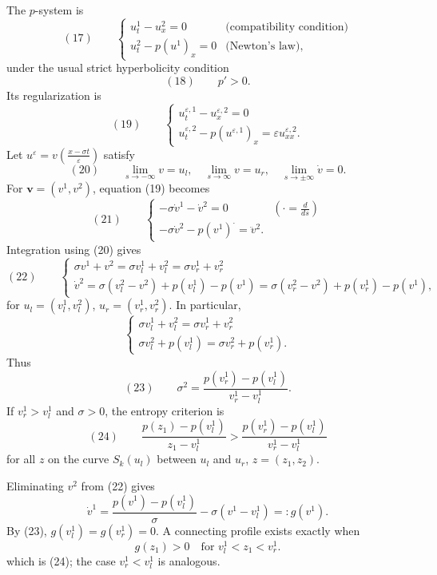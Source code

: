 \begin{example}
\label{ex:traveling-waves-p-system}

The $p$-system is
$$(17) \qquad \begin{cases} u^1_t - u^2_x = 0 & \text{(compatibility condition)} \\ u^2_t - p(u^1)_x = 0 & \text{(Newton's law)}, \end{cases}$$
under the usual strict hyperbolicity condition
$$(18) \qquad p' > 0.$$
Its regularization is
$$(19) \qquad \begin{cases} u^{\varepsilon,1}_t - u^{\varepsilon,2}_x = 0 \\ u^{\varepsilon,2}_t - p(u^{\varepsilon,1})_x = \varepsilon u^{\varepsilon,2}_{xx}. \end{cases}$$
Let $u^\varepsilon = v\left(\frac{x-\sigma t}{\varepsilon}\right)$ satisfy
$$(20) \qquad \lim_{s\to-\infty} v = u_l, \quad \lim_{s\to\infty} v = u_r, \quad \lim_{s\to\pm\infty} \dot v = 0.$$
For $\mathbf v=(v^1,v^2)$, equation (19) becomes
$$(21) \qquad \begin{cases} -\sigma\dot v^1 - \dot v^2 = 0 & \left(\cdot = \frac{d}{ds}\right) \\ -\sigma\dot v^2 - p(v^1)^\cdot = \ddot v^2. \end{cases}$$
Integration using (20) gives
$$(22) \qquad \begin{cases} \sigma v^1 + v^2 = \sigma v^1_l + v^2_l = \sigma v^1_r + v^2_r \\ \dot v^2 = \sigma(v^2_l-v^2) + p(v^1_l) - p(v^1) = \sigma(v^2_r-v^2) + p(v^1_r) - p(v^1), \end{cases}$$
for $u_l=(v^1_l,v^2_l)$, $u_r=(v^1_r,v^2_r)$. In particular,
$$\begin{cases} \sigma v^1_l + v^2_l = \sigma v^1_r + v^2_r \\ \sigma v^2_l + p(v^1_l) = \sigma v^2_r + p(v^1_r). \end{cases}$$
Thus
$$(23) \qquad \sigma^2 = \frac{p(v^1_r)-p(v^1_l)}{v^1_r - v^1_l}.$$
If $v^1_r>v^1_l$ and $\sigma>0$, the entropy criterion is
$$(24) \qquad \frac{p(z_1)-p(v^1_l)}{z_1-v^1_l} > \frac{p(v^1_r)-p(v^1_l)}{v^1_r-v^1_l}$$
for all $z$ on the curve $S_k(u_l)$ between $u_l$ and $u_r$, $z=(z_1,z_2)$.

Eliminating $v^2$ from (22) gives
$$\dot v^1 = \frac{p(v^1)-p(v^1_l)}{\sigma} - \sigma(v^1-v^1_l) =: g(v^1).$$
By (23), $g(v^1_l)=g(v^1_r)=0$. A connecting profile exists exactly when
$$g(z_1) > 0 \quad \text{for } v^1_l < z_1 < v^1_r.$$
which is (24); the case $v^1_r<v^1_l$ is analogous.
\end{example}

